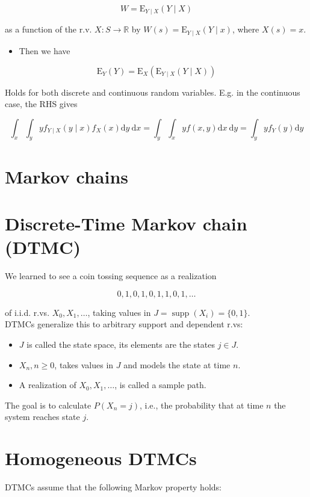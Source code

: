 \documentclass[10pt]{article}
\begin{document}
$$
W=\mathrm{E}_{Y \mid X}(Y \mid X)
$$

as a function of the r.v. $X: S \rightarrow \mathbb{R}$ by $W(s)=\mathrm{E}_{Y \mid X}(Y \mid x)$, where $X(s)=x$.

\begin{itemize}
  \item Then we have
\end{itemize}

$$
\mathrm{E}_{Y}(Y)=\mathrm{E}_{X}\left(\mathrm{E}_{Y \mid X}(Y \mid X)\right)
$$

Holds for both discrete and continuous random variables. E.g. in the continuous case, the RHS gives

$$
\int_{x} \int_{y} y f_{Y \mid X}(y \mid x) f_{X}(x) \mathrm{d} y \mathrm{~d} x=\int_{y} \int_{x} y f(x, y) \mathrm{d} x \mathrm{~d} y=\int_{y} y f_{Y}(y) \mathrm{d} y
$$



\section*{Markov chains}
\section*{Discrete-Time Markov chain (DTMC)}
We learned to see a coin tossing sequence as a realization

$$
0,1,0,1,0,1,1,0,1, \ldots
$$

of i.i.d. r.vs. $X_{0}, X_{1}, \ldots$, taking values in $J=\operatorname{supp}\left(X_{i}\right)=\{0,1\}$.\\
DTMCs generalize this to arbitrary support and dependent r.vs:

\begin{itemize}
  \item $J$ is called the state space, its elements are the states $j \in J$.
  \item $X_{n}, n \geq 0$, takes values in $J$ and models the state at time $n$.
  \item A realization of $X_{0}, X_{1}, \ldots$, is called a sample path.
\end{itemize}

The goal is to calculate $P\left(X_{n}=j\right)$, i.e., the probability that at time $n$ the system reaches state $j$.

\section*{Homogeneous DTMCs}
DTMCs assume that the following Markov property holds:
\end{document}
